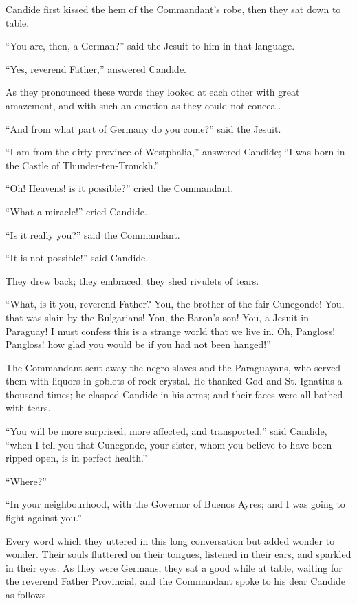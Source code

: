 Candide first kissed the hem of the Commandant's robe, then they sat down to table.

``You are, then, a German?'' said the Jesuit to him in that language.

``Yes, reverend Father,'' answered Candide.

As they pronounced these words they looked at each other with great amazement, and with such an emotion as they could not conceal.

``And from what part of Germany do you come?'' said the Jesuit.

``I am from the dirty province of Westphalia,'' answered Candide; ``I was born in the Castle of Thunder-ten-Tronckh.''

``Oh! Heavens! is it possible?'' cried the Commandant.

``What a miracle!'' cried Candide.

``Is it really you?'' said the Commandant.

``It is not possible!'' said Candide.

They drew back; they embraced; they shed rivulets of tears.

``What, is it you, reverend Father? You, the brother of the fair Cunegonde! You, that was slain by the Bulgarians! You, the Baron's son! You, a Jesuit in Paraguay! I must confess this is a strange world that we live in. Oh, Pangloss! Pangloss! how glad you would be if you had not been hanged!''

The Commandant sent away the negro slaves and the Paraguayans, who served them with liquors in goblets of rock-crystal. He thanked God and St. Ignatius a thousand times; he clasped Candide in his arms; and their faces were all bathed with tears.

``You will be more surprised, more affected, and transported,'' said Candide, ``when I tell you that Cunegonde, your sister, whom you believe to have been ripped open, is in perfect health.''

``Where?''

``In your neighbourhood, with the Governor of Buenos Ayres; and I was going to fight against you.''

Every word which they uttered in this long conversation but added wonder to wonder. Their souls fluttered on their tongues, listened in their ears, and sparkled in their eyes. As they were Germans, they sat a good while at table, waiting for the reverend Father Provincial, and the Commandant spoke to his dear Candide as follows.

